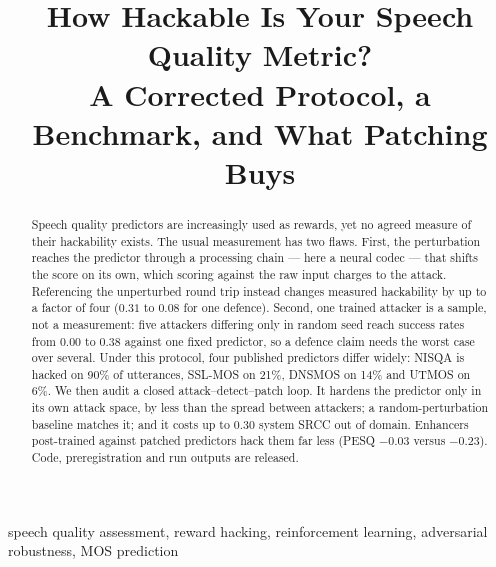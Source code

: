 \documentclass[conference]{IEEEtran}
\begin{document}
\title{How Hackable Is Your Speech Quality Metric?\\A Corrected Protocol, a Benchmark, and What Patching Buys}

\author{
\and
{}
}

\maketitle

\begin{abstract}
Speech quality predictors are increasingly used as rewards, yet no agreed measure of their
hackability exists. The usual measurement has two flaws. First, the perturbation reaches the predictor through a
processing chain --- here a neural codec --- that shifts the score on its own, which scoring against the raw input
charges to the attack. Referencing the unperturbed round trip instead changes measured hackability by up
to a factor of four ($0.31$ to $0.08$ for one defence). Second, one trained attacker is a sample, not a
measurement: five attackers differing only in random seed reach success rates from $0.00$ to $0.38$ against one
fixed predictor, so a defence claim needs the worst case over several. Under this protocol, four published
predictors differ widely: NISQA is hacked on 90\% of utterances, SSL-MOS on 21\%, DNSMOS on 14\% and UTMOS on
6\%. We then audit a closed attack--detect--patch loop. It hardens the predictor only in its own attack
space, by less than the spread between attackers; a random-perturbation baseline matches it; and it costs up
to 0.30 system SRCC out of domain. Enhancers post-trained against patched predictors hack them far less (PESQ
$-0.03$ versus $-0.23$). Code, preregistration and run outputs are released.
\end{abstract}

\begin{IEEEkeywords}
speech quality assessment, reward hacking, reinforcement learning, adversarial robustness, MOS prediction
\end{IEEEkeywords}
\end{document}
